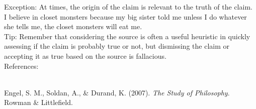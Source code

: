 \documentclass[a4paper,12pt,single,pdftex]{scrartcl}
\begin{document}
{    
      Exception: At times, the origin of the claim is relevant to the truth of the claim. 
    \\

    
      I believe in closet monsters because my big sister told me unless I do whatever she tells me, the closet monsters will eat me.
    \\

    
      Tip: Remember that considering the source is often a useful heuristic in quickly assessing if the claim is probably true or not, but dismissing the claim or accepting it as true based on the source is fallacious.
    \\

    References:

    
      
        
      \\

      
        
          Engel, S. M., Soldan, A., \& Durand, K. (2007). {\it The Study of Philosophy}. Rowman \& Littlefield.
        
      
    
  }
\end{document}
